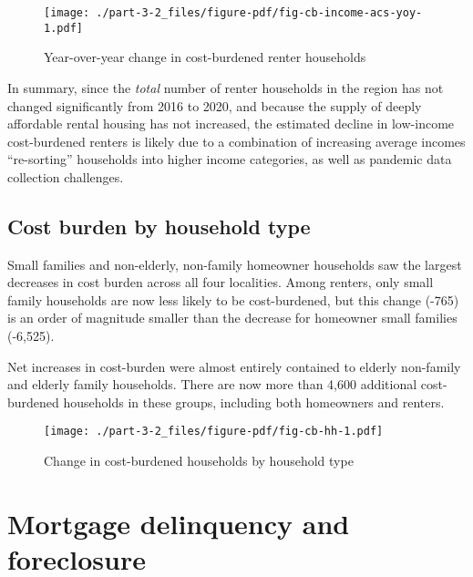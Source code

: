 \documentclass[
  letterpaper,
  DIV=11,
  numbers=noendperiod]{scrreprt}
\begin{document}
\begin{figure}

{\centering \texttt{[image: ./part-3-2\_files/figure-pdf/fig-cb-income-acs-yoy-1.pdf]}

}

\caption{\label{fig-cb-income-acs-yoy}Year-over-year change in
cost-burdened renter households}

\end{figure}

In summary, since the \emph{total} number of renter households in the
region has not changed significantly from 2016 to 2020, and because the
supply of deeply affordable rental housing has not increased, the
estimated decline in low-income cost-burdened renters is likely due to a
combination of increasing average incomes ``re-sorting'' households into
higher income categories, as well as pandemic data collection
challenges.

\hypertarget{cost-burden-by-household-type}{%
\subsection{Cost burden by household
type}\label{cost-burden-by-household-type}}

Small families and non-elderly, non-family homeowner households saw the
largest decreases in cost burden across all four localities. Among
renters, only small family households are now less likely to be
cost-burdened, but this change (-765) is an order of magnitude smaller
than the decrease for homeowner small families (-6,525).

Net increases in cost-burden were almost entirely contained to elderly
non-family and elderly family households. There are now more than 4,600
additional cost-burdened households in these groups, including both
homeowners and renters.

\begin{figure}

{\centering \texttt{[image: ./part-3-2\_files/figure-pdf/fig-cb-hh-1.pdf]}

}

\caption{\label{fig-cb-hh}Change in cost-burdened households by
household type}

\end{figure}

\hypertarget{mortgage-delinquency-and-foreclosure}{%
\section{Mortgage delinquency and
foreclosure}\label{mortgage-delinquency-and-foreclosure}}
\end{document}
